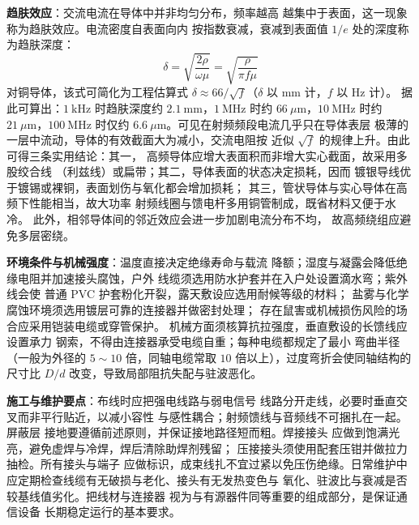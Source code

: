 \textbf{趋肤效应}：交流电流在导体中并非均匀分布，频率越高
越集中于表面，这一现象称为趋肤效应。电流密度自表面向内
按指数衰减，衰减到表面值 $1/e$ 处的深度称为趋肤深度：
\begin{equation}
\delta = \sqrt{\frac{2\rho}{\omega\mu}} = \sqrt{\frac{\rho}{\pi f \mu}}
\end{equation}
对铜导体，该式可简化为工程估算式
$\delta \approx 66/\sqrt{f}$（$\delta$ 以 mm 计，$f$ 以 Hz 计）。
据此可算出：$1\ \mathrm{kHz}$ 时趋肤深度约
$2.1\ \mathrm{mm}$，$1\ \mathrm{MHz}$ 时约
$66\ \mu\mathrm{m}$，$10\ \mathrm{MHz}$ 时约
$21\ \mu\mathrm{m}$，$100\ \mathrm{MHz}$ 时仅约
$6.6\ \mu\mathrm{m}$。可见在射频频段电流几乎只在导体表层
极薄的一层中流动，导体的有效截面大为减小，交流电阻按
近似 $\sqrt{f}$ 的规律上升。由此可得三条实用结论：其一，
高频导体应增大表面积而非增大实心截面，故采用多股绞合线
（利兹线）或扁带；其二，导体表面的状态决定损耗，因而
镀银导线优于镀锡或裸铜，表面划伤与氧化都会增加损耗；
其三，管状导体与实心导体在高频下性能相当，故大功率
射频线圈与馈电杆多用铜管制成，既省材料又便于水冷。
此外，相邻导体间的邻近效应会进一步加剧电流分布不均，
故高频绕组应避免多层密绕。

\textbf{环境条件与机械强度}：温度直接决定绝缘寿命与载流
降额；湿度与凝露会降低绝缘电阻并加速接头腐蚀，户外
线缆须选用防水护套并在入户处设置滴水弯；紫外线会使
普通 PVC 护套粉化开裂，露天敷设应选用耐候等级的材料；
盐雾与化学腐蚀环境须选用镀层可靠的连接器并做密封处理；
存在鼠害或机械损伤风险的场合应采用铠装电缆或穿管保护。
机械方面须核算抗拉强度，垂直敷设的长馈线应设置承力
钢索，不得由连接器承受电缆自重；每种电缆都规定了最小
弯曲半径（一般为外径的 $5\sim10$ 倍，同轴电缆常取
$10$ 倍以上），过度弯折会使同轴结构的尺寸比 $D/d$
改变，导致局部阻抗失配与驻波恶化。

\textbf{施工与维护要点}：布线时应把强电线路与弱电信号
线路分开走线，必要时垂直交叉而非平行贴近，以减小容性
与感性耦合；射频馈线与音频线不可捆扎在一起。屏蔽层
接地要遵循前述原则，并保证接地路径短而粗。焊接接头
应做到饱满光亮，避免虚焊与冷焊，焊后清除助焊剂残留；
压接接头须使用配套压钳并做拉力抽检。所有接头与端子
应做标识，成束线扎不宜过紧以免压伤绝缘。日常维护中
应定期检查线缆有无破损与老化、接头有无发热变色与
氧化、驻波比与衰减是否较基线值劣化。把线材与连接器
视为与有源器件同等重要的组成部分，是保证通信设备
长期稳定运行的基本要求。
